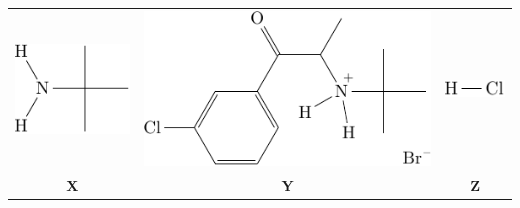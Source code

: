 \documentclass{article}
\begin{document}
	\begin{tabular}{ccc}
		\includegraphics{../t-butylamine.pdf} & \includegraphics{../intermediate-Y.pdf} & \includegraphics{../hcl.pdf} \\
		\textbf{X} & \textbf{Y} & \textbf{Z}
	\end{tabular}
\end{document}
